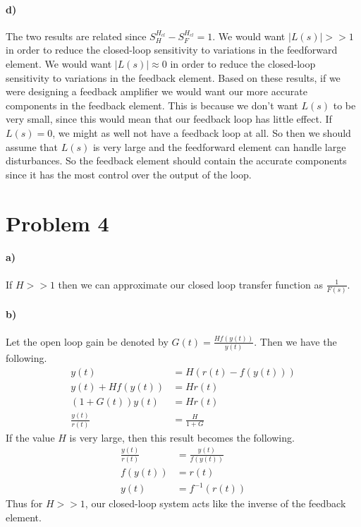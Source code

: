 \documentclass[12pt]{article}
\begin{document}
\paragraph{d)}

The two results are related since \(S_H^{H_{cl}}-S_F^{H_{cl}}=1\).
We would want \(|L(s)|>>1\) in order to reduce the closed-loop sensitivity
to variations in the feedforward element. We would want \(|L(s)|\approx 0\)
in order to reduce the closed-loop sensitivity to variations in the feedback
element. Based on these results, if we were designing a feedback amplifier
we would want our more accurate components in the feedback element. This
is because we don't want \(L(s)\) to be very small, since this would mean
that our feedback loop has little effect. If \(L(s)=0\), we might as well
not have a feedback loop at all. So then we should assume that \(L(s)\) is
very large and the feedforward element can handle large disturbances. So the
feedback element should contain the accurate components since it has the most
control over the output of the loop.

\section*{Problem 4}

\paragraph{a)}

If \(H>>1\) then we can approximate our closed loop transfer function as \(\frac{1}{F(s)}\).

\paragraph{b)}

Let the open loop gain be denoted by \(G(t)=\frac{Hf(y(t))}{y(t)}\). Then we have the following.
\begin{align*}
    y(t)&=H(r(t)-f(y(t)))\\
    y(t)+Hf(y(t))&=Hr(t)\\
    (1+G(t))y(t)&=Hr(t)\\
    \frac{y(t)}{r(t)}&=\frac{H}{1+G}
\end{align*}
If the value \(H\) is very large, then this result becomes the following.
\begin{align*}
    \frac{y(t)}{r(t)}&=\frac{y(t)}{f(y(t))}\\
    f(y(t))&=r(t)\\
    y(t)&=f^{-1}(r(t))
\end{align*}
Thus for \(H>>1\), our closed-loop system acts like the inverse of the feedback element.
\end{document}
